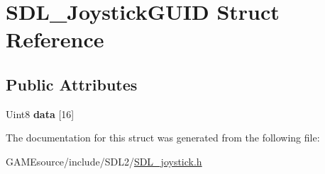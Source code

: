 \hypertarget{struct_s_d_l___joystick_g_u_i_d}{}\section{S\+D\+L\+\_\+\+Joystick\+G\+U\+ID Struct Reference}
\label{struct_s_d_l___joystick_g_u_i_d}
\subsection*{Public Attributes}
\begin{DoxyCompactItemize}
\item 
\mbox{\label{struct_s_d_l___joystick_g_u_i_d_a16935b928a608fe98e0509f242590597}} 
Uint8 {\bfseries data} \mbox{[}16\mbox{]}
\end{DoxyCompactItemize}


The documentation for this struct was generated from the following file\+:\begin{DoxyCompactItemize}
\item 
G\+A\+M\+Esource/include/\+S\+D\+L2/\mbox{\hyperlink{_s_d_l__joystick_8h}{S\+D\+L\+\_\+joystick.\+h}}\end{DoxyCompactItemize}
